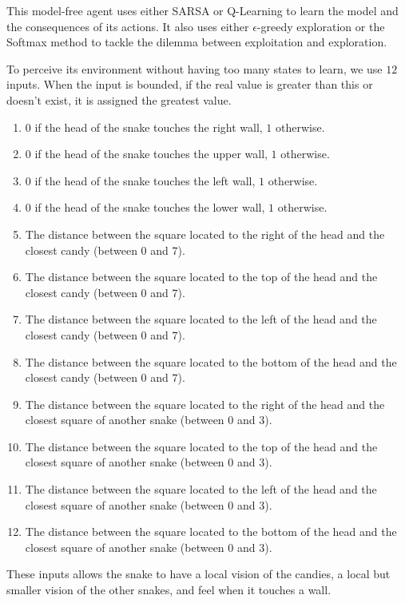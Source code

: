 \documentclass[journal, a4paper]{IEEEtran}
\begin{document}
This model-free agent uses either SARSA or Q-Learning to learn the model and the consequences of its actions.
It also uses either $\epsilon$-greedy exploration or the Softmax method to tackle the dilemma between exploitation and exploration.

To perceive its environment without having too many states to learn, we use $12$ inputs.
When the input is bounded, if the real value is greater than this or doesn't exist, it is assigned the greatest value.
\begin{enumerate}
    \item $0$ if the head of the snake touches the right wall, $1$ otherwise.
    \item $0$ if the head of the snake touches the upper wall, $1$ otherwise.
    \item $0$ if the head of the snake touches the left wall, $1$ otherwise.
    \item $0$ if the head of the snake touches the lower wall, $1$ otherwise.
    \item The distance between the square located to the right of the head and the closest candy (between $0$ and $7$).
    \item The distance between the square located to the top of the head and the closest candy (between $0$ and $7$).
    \item The distance between the square located to the left of the head and the closest candy (between $0$ and $7$).
    \item The distance between the square located to the bottom of the head and the closest candy (between $0$ and $7$).
    \item The distance between the square located to the right of the head and the closest square of another snake (between $0$ and $3$).
    \item The distance between the square located to the top of the head and the closest square of another snake (between $0$ and $3$).
    \item The distance between the square located to the left of the head and the closest square of another snake (between $0$ and $3$).
    \item The distance between the square located to the bottom of the head and the closest square of another snake (between $0$ and $3$).
\end{enumerate}
These inputs allows the snake to have a local vision of the candies, a local but smaller vision of the other snakes, and feel when it touches a wall.
\end{document}
